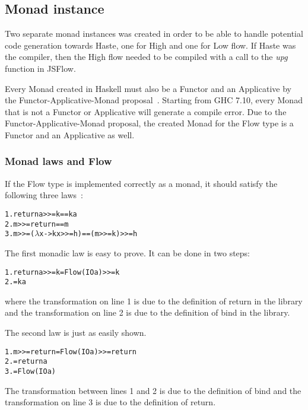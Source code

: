 \subsection{Monad instance}
Two separate monad instances was created in order to be able to handle potential code generation towards Haste, one for High and one for Low flow. If Haste was the compiler, then the High flow needed to be compiled with a call to the \emph{upg} function in JSFlow.

Every Monad created in Haskell must also be a Functor and an Applicative by the Functor-Applicative-Monad proposal~\cite{functor_applicative_monad}. Starting from GHC 7.10, every Monad that is not a Functor or Applicative will generate a compile error. Due to the Functor-Applicative-Monad proposal, the created Monad for the Flow type is a Functor and an Applicative as well.
\subsubsection{Monad laws and Flow}
If the Flow type is implemented correctly as a monad, it should satisfy the following three laws~\cite{functor-monad-law}:
\begin{alltt}
  1.  return a >>= k  ==  k a
  2.  m >>= return  ==  m
  3.  m >>= (\(\lambda\)x -> k x >>= h)  ==  (m >>= k) >>= h
\end{alltt}
The first monadic law is easy to prove. It can be done in two steps:
\begin{alltt}
  1. return a >>= k = Flow (IO a) >>= k
  2.                = k a
\end{alltt}
where the transformation on line 1 is due to the definition of return in the library and the transformation on line 2 is due to the definition of bind in the library.

The second law is just as easily shown.
\begin{alltt}
  1. m >>= return = Flow (IO a) >>= return
  2.              = return a
  3.              = Flow (IO a)
\end{alltt}
The transformation between lines 1 and 2 is due to the definition of bind and the transformation on line 3 is due to the definition of return.

